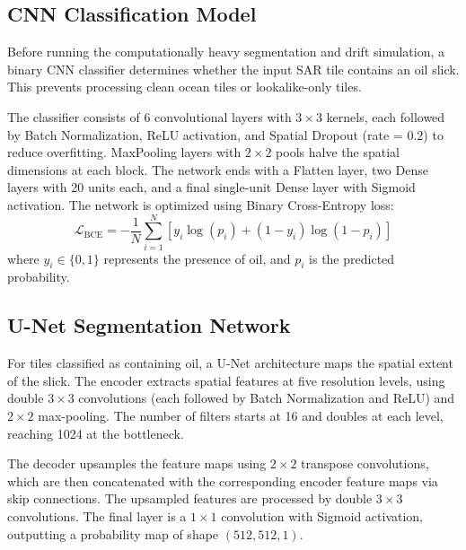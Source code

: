 \documentclass[conference]{IEEEtran}
\begin{document}
\subsection{CNN Classification Model}
Before running the computationally heavy segmentation and drift simulation, a binary CNN classifier determines whether the input SAR tile contains an oil slick. This prevents processing clean ocean tiles or lookalike-only tiles.

The classifier consists of 6 convolutional layers with $3 \times 3$ kernels, each followed by Batch Normalization, ReLU activation, and Spatial Dropout (rate = $0.2$) to reduce overfitting. MaxPooling layers with $2 \times 2$ pools halve the spatial dimensions at each block. The network ends with a Flatten layer, two Dense layers with 20 units each, and a final single-unit Dense layer with Sigmoid activation. The network is optimized using Binary Cross-Entropy loss:
\begin{equation}
\mathcal{L}_{\text{BCE}} = - \frac{1}{N} \sum_{i=1}^N \left[ y_i \log(p_i) + (1 - y_i) \log(1 - p_i) \right]
\end{equation}
where $y_i \in \{0, 1\}$ represents the presence of oil, and $p_i$ is the predicted probability.

\subsection{U-Net Segmentation Network}
For tiles classified as containing oil, a U-Net architecture maps the spatial extent of the slick. The encoder extracts spatial features at five resolution levels, using double $3\times3$ convolutions (each followed by Batch Normalization and ReLU) and $2\times2$ max-pooling. The number of filters starts at 16 and doubles at each level, reaching 1024 at the bottleneck. 

The decoder upsamples the feature maps using $2\times2$ transpose convolutions, which are then concatenated with the corresponding encoder feature maps via skip connections. The upsampled features are processed by double $3\times3$ convolutions. The final layer is a $1\times1$ convolution with Sigmoid activation, outputting a probability map of shape $(512, 512, 1)$.
\end{document}
